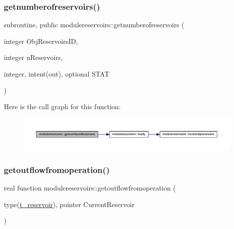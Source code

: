 \subsubsection{\texorpdfstring{getnumberofreservoirs()}{getnumberofreservoirs()}}
{\footnotesize\ttfamily subroutine, public modulereservoirs\+::getnumberofreservoirs (\begin{DoxyParamCaption}\item[{integer}]{Obj\+Reservoirs\+ID,  }\item[{integer}]{n\+Reservoirs,  }\item[{integer, intent(out), optional}]{S\+T\+AT }\end{DoxyParamCaption})}

Here is the call graph for this function\+:\nopagebreak
\begin{figure}[H]
\begin{center}
\leavevmode
\includegraphics[width=350pt]{namespacemodulereservoirs_a6c97c189244107e76016a8e045715d94_cgraph}
\end{center}
\end{figure}
\mbox{\label{namespacemodulereservoirs_ac1692cb00cb68968ee7099ff5bf14ed0}} 
\subsubsection{\texorpdfstring{getoutflowfromoperation()}{getoutflowfromoperation()}}
{\footnotesize\ttfamily real function modulereservoirs\+::getoutflowfromoperation (\begin{DoxyParamCaption}\item[{type(\mbox{\hyperlink{structmodulereservoirs_1_1t__reservoir}{t\+\_\+reservoir}}), pointer}]{Current\+Reservoir }\end{DoxyParamCaption})\hspace{0.3cm}{\ttfamily [private]}}

